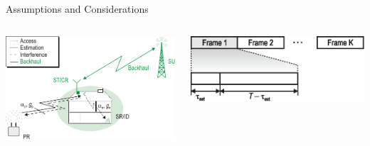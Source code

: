 \documentclass[12pt]{beamer}
\newcommand{\fs}[2]{\fontsize{#1 pt}{#2}\selectfont}
\begin{document}
\begin{frame}{Assumptions and Considerations}
        \begin{columns}
                \begin{column}{0.5 \paperwidth}
                        \begin{center}
                                \includegraphics[width = 0.38 \paperwidth]{../figures/CR_Scenario_Underlay}
                        \end{center}
                \end{column}
                \begin{column}{0.5 \paperwidth}
                        \begin{center}
                                \includegraphics[width = 0.42 \paperwidth]{../figures/Frame_Structure_grau_U}
                        \end{center}
                \end{column}
        \end{columns}
        \vspace{0.5cm}
        \begin{itemize}
                \fs{8}{10}

\end{itemize}
\end{frame}
\end{document}

